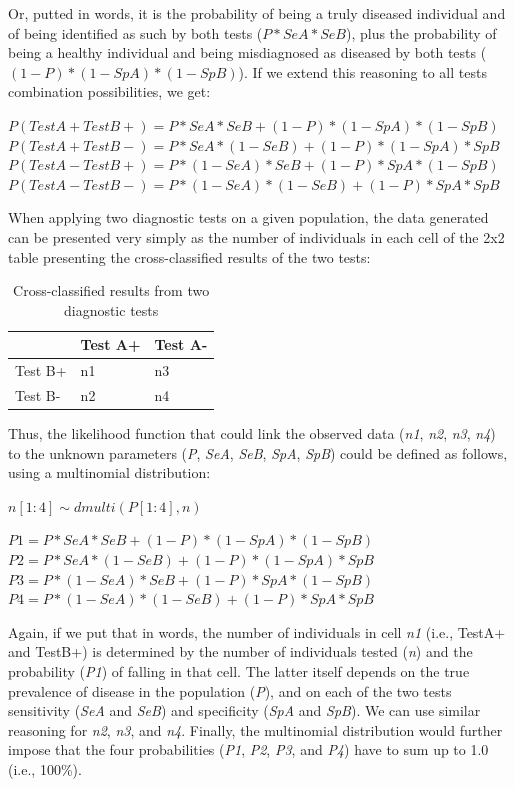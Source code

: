 \documentclass[
]{book}
\begin{document}
Or, putted in words, it is the probability of being a truly diseased individual and of being identified as such by both tests (\(P*SeA*SeB\)), plus the probability of being a healthy individual and being misdiagnosed as diseased by both tests (\((1-P)*(1-SpA)*(1-SpB)\)). If we extend this reasoning to all tests combination possibilities, we get:

\(P(TestA+TestB+) = P*SeA*SeB + (1-P)*(1-SpA)*(1-SpB)\)\\
\(P(TestA+TestB-) = P*SeA*(1-SeB) + (1-P)*(1-SpA)*SpB\)\\
\(P(TestA-TestB+) = P*(1-SeA)*SeB + (1-P)*SpA*(1-SpB)\)\\
\(P(TestA-TestB-) = P*(1-SeA)*(1-SeB) + (1-P)*SpA*SpB\)

When applying two diagnostic tests on a given population, the data generated can be presented very simply as the number of individuals in each cell of the 2x2 table presenting the cross-classified results of the two tests:

\begin{table}
\centering
\caption{Cross-classified results from two diagnostic tests}
\centering
\begin{tabular}[t]{l|l|l}
\hline
  & Test A+ & Test A-\\
\hline
Test B+ & n1 & n3\\
\hline
Test B- & n2 & n4\\
\hline
\end{tabular}
\end{table}

Thus, the likelihood function that could link the observed data (\emph{n1}, \emph{n2}, \emph{n3}, \emph{n4}) to the unknown parameters (\emph{P}, \emph{SeA}, \emph{SeB}, \emph{SpA}, \emph{SpB}) could be defined as follows, using a multinomial distribution:

\(n[1:4] \sim dmulti(P[1:4], n)\)

\(P1 = P*SeA*SeB + (1-P)*(1-SpA)*(1-SpB)\)\\
\(P2 = P*SeA*(1-SeB) + (1-P)*(1-SpA)*SpB\)\\
\(P3 = P*(1-SeA)*SeB + (1-P)*SpA*(1-SpB)\)\\
\(P4 = P*(1-SeA)*(1-SeB) + (1-P)*SpA*SpB\)

Again, if we put that in words, the number of individuals in cell \emph{n1} (i.e., TestA+ and TestB+) is determined by the number of individuals tested (\emph{n}) and the probability (\emph{P1}) of falling in that cell. The latter itself depends on the true prevalence of disease in the population (\emph{P}), and on each of the two tests sensitivity (\emph{SeA} and \emph{SeB}) and specificity (\emph{SpA} and \emph{SpB}). We can use similar reasoning for \emph{n2}, \emph{n3}, and \emph{n4}. Finally, the multinomial distribution would further impose that the four probabilities (\emph{P1}, \emph{P2}, \emph{P3}, and \emph{P4}) have to sum up to 1.0 (i.e., 100\%).
\end{document}

